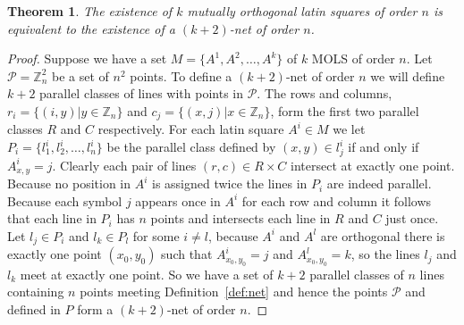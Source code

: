 \documentclass{article}
\newtheorem{theorem}{Theorem}
\begin{document}
\begin{theorem}\label{thm:mols-to-net}
  The existence of \(k\) mutually orthogonal latin squares of order \(n\) is equivalent to the existence of a \((k + 2)\)-net of order \(n\).
\end{theorem}
\begin{proof}

  Suppose we have a set \(M = \{A^{1}, A^{2}, \ldots, A^{k}\}\) of \(k\) MOLS of order \(n\). Let \(\mathcal{P} = \mathbb{Z}_{n}^{2}\) be a set of
\(n^{2}\) points. To define a \((k + 2)\)-net of order \(n\) we will define
\(k + 2\) parallel classes of lines with points in \(\mathcal{P}\). The rows and columns,
\(r_{i} = \{(i, y) | y \in \mathbb{Z}_{n}\}\) and
\(c_{j} = \{(x, j) | x \in \mathbb{Z}_{n}\}\), form the first two parallel classes
\(R\) and \(C\) respectively. For each latin square \(A^{i} \in M\) we let
\(P_{i} = \{l_{1}^{i}, l_{2}^{i}, \ldots, l_{n}^{i}\}\) be the parallel class
defined by \((x, y) \in l_{j}^{i}\) if and only if \(A^{i}_{x, y} = j\).
Clearly each pair of lines \((r, c) \in R \times C\) intersect at exactly one point.
Because no position in \(A^{i}\) is assigned twice the lines in \(P_{i}\) are
indeed parallel. Because each symbol \(j\) appears once in \(A^{i}\) for each
row and column it follows that each line in \(P_{i}\) has \(n\) points and
intersects each line in \(R\) and \(C\) just once. Let \(l_{j} \in P_{i}\) and \(l_{k} \in P_{l}\) for some \(i \ne l\), because \(A^{i}\) and \(A^{l}\) are orthogonal there is exactly one point \((x_{0}, y_{0})\) such that \(A^{i}_{x_{0}, y_{0}} = j\) and \(A^{l}_{x_{0}, y_{0}} = k\), so the lines \(l_{j}\) and \(l_{k}\) meet at exactly one point.
So we have a set of \(k + 2\) parallel classes
of \(n\) lines containing \(n\) points meeting Definition~\ref{def:net} and hence the points \(\mathcal{P}\) and defined in \(P\) form a \((k + 2)\)-net of order \(n\).


\end{proof}
\end{document}
